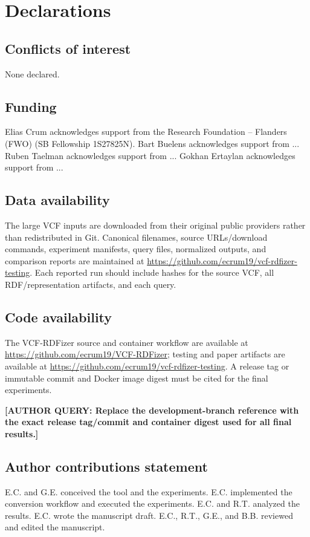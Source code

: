 \documentclass[pdflatex,sn-mathphys-num]{sn-jnl}%
\newenvironment{revision}{\begingroup\color{revisionblue}}{\endgroup}%
\newcommand{\authorquery}[1]{%
  \par\smallskip\noindent
  {\color{queryorange}\textbf{[AUTHOR QUERY: #1]}}%
  \par\smallskip
}%
\theoremstyle{thmstyleone}%
\theoremstyle{thmstyletwo}%
\theoremstyle{thmstylethree}%
\begin{document}
\section*{Declarations}

\subsection{Conflicts of interest}
None declared.

\subsection{Funding}
Elias Crum acknowledges support from the Research Foundation – Flanders (FWO) (SB Fellowship 1S27825N).
Bart Buelens acknowledges support from ...
Ruben Taelman acknowledges support from ...
Gokhan Ertaylan acknowledges support from ...

\begin{revision}
\subsection{Data availability}
The large VCF inputs are downloaded from their original public providers rather than redistributed in Git. Canonical filenames, source URLs/download commands, experiment manifests, query files, normalized outputs, and comparison reports are maintained at \url{https://github.com/ecrum19/vcf-rdfizer-testing}. Each reported run should include hashes for the source VCF, all RDF/representation artifacts, and each query.

\subsection{Code availability}
The VCF-RDFizer source and container workflow are available at \url{https://github.com/ecrum19/VCF-RDFizer}; testing and paper artifacts are available at \url{https://github.com/ecrum19/vcf-rdfizer-testing}. A release tag or immutable commit and Docker image digest must be cited for the final experiments.
\end{revision}
\authorquery{Replace the development-branch reference with the exact release tag/commit and container digest used for all final results.}

\subsection{Author contributions statement}
E.C. and G.E. conceived the tool and the experiments.
E.C. implemented the conversion workflow and executed the experiments.
E.C. and R.T. analyzed the results.
E.C. wrote the manuscript draft.
E.C., R.T., G.E., and B.B. reviewed and edited the manuscript.
\end{document}
